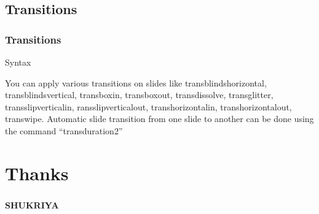 \documentclass{beamer}
\begin{document}
            \subsection{Transitions}
                \begin{frame}
                \frametitle{Transitions}
                \transwipe
                \begin{block}{Syntax}
                                
                    \end{block}
                    You can apply various transitions on slides like transblindshorizontal, transblindsvertical, transboxin, transboxout, transdissolve, transglitter, transslipverticalin, ransslipverticalout, transhorizontalin, transhorizontalout, transwipe. Automatic slide transition from one slide to another can be done using the command ``transduration{2}''
                    
                \end{frame}


    \section{Thanks} 
                \begin{frame}
                \frametitle{}
                    \color{yellow}\textbf{\textrm{\LARGE{SHUKRIYA}}}
                \end{frame}

    
\end{document}
